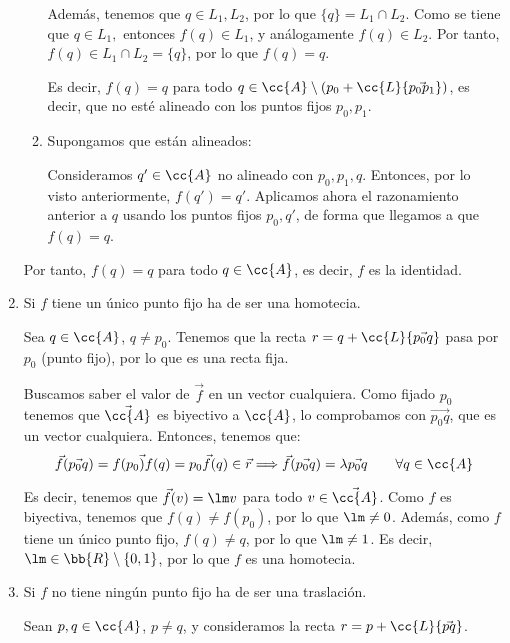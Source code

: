 \begin{ejercicio}
\begin{enumerate}
\begin{enumerate}
            Además, tenemos que $q\in L_1,L_2$, por lo que $\{q\}= L_1\cap L_2$. Como se tiene que $q\in L_1,$ entonces $f(q)\in L_1$, y análogamente $f(q)\in L_2$. Por tanto, $f(q)\in L_1\cap L_2 = \{q\}$, por lo que $f(q)=q$.
            
            Es decir, $f(q)=q$ para todo $q\in \cc{A}\setminus (p_0+\cc{L}\{\vec{p_0p_1}\})$, es decir, que no esté alineado con los puntos fijos $p_0,p_1$.

            \item Supongamos que están alineados:
            
            Consideramos $q'\in \cc{A}$ no alineado con $p_0,p_1,q$. Entonces, por lo visto anteriormente, $f(q')=q'$. Aplicamos ahora el razonamiento anterior a $q$ usando los puntos fijos $p_0,q'$, de forma que llegamos a que $f(q)=q$.
        \end{enumerate}

        Por tanto, $f(q)=q$ para todo $q\in \cc{A}$, es decir, $f$ es la identidad.
        
        \item Si $f$ tiene un único punto fijo ha de ser una homotecia.
        
        Sea $q\in \cc{A}$, $q\neq p_0$. Tenemos que la recta $r=q+\cc{L}\{\vec{p_0q}\}$ pasa por $p_0$ (punto fijo), por lo que es una recta fija.

        Buscamos saber el valor de $\vec{f}$ en un vector cualquiera. Como fijado $p_0$ tenemos que $\vec{\cc{A}}$ es biyectivo a $\cc{A}$, lo comprobamos con $\vec{p_0q}$, que es un vector cualquiera. Entonces, tenemos que:
        \begin{equation*}
            \vec{f}(\vec{p_0q}) = \vec{f(p_0)f(q)} = \vec{p_0f(q)} \in \vec{r} \Longrightarrow \vec{f}(\vec{p_0q}) = \lambda \vec{p_0q} \qquad \forall q\in \cc{A}
        \end{equation*}

        Es decir, tenemos que $\vec{f}(v)=\lm v$ para todo $v\in \vec{\cc{A}}$. Como $f$ es biyectiva, tenemos que $f(q)\neq f(p_0)$, por lo que $\lm\neq 0$. Además, como $f$ tiene un único punto fijo, $f(q)\neq q$, por lo que $\lm\neq 1$. Es decir, $\lm \in \bb{R}\setminus \{0,1\}$, por lo que $f$ es una homotecia.


        \item Si $f$ no tiene ningún punto fijo ha de ser una traslación.
        
        Sean $p,q\in \cc{A}$, $p\neq q$, y consideramos la recta $r=p+\cc{L}\{\vec{pq}\}$.


\end{enumerate}
\end{ejercicio}
